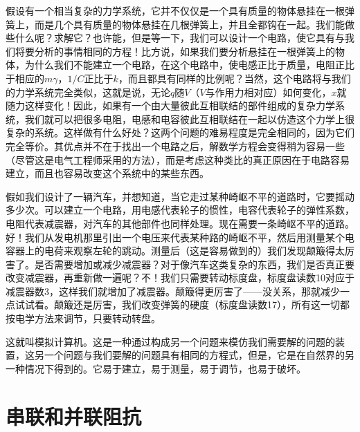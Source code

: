假设有一个相当复杂的力学系统，它并不仅仅是一个具有质量的物体悬挂在一根弹簧上，而是几个具有质量的物体悬挂在几根弹簧上，并且全都钩在一起。我们能做些什么呢？求解它？也许能，但是等一下，我们可以设计一个电路，使它具有与我们将要分析的事情相同的方程！比方说，如果我们要分析悬挂在一根弹簧上的物体，为什么我们不能建立一个电路，在这个电路中，使电感正比于质量，电阻正比于相应的$m\gamma$，$1/C$正比于$k$，而且都具有同样的比例呢？当然，这个电路将与我们的力学系统完全类似，这就是说，无论$q$随$V$（$V$与作用力相对应）如何变化，$x$就随力这样变化！因此，如果有一个由大量彼此互相联结的部件组成的复杂力学系统，我们就可以把很多电阻，电感和电容彼此互相联结在一起以仿造这个力学上很复杂的系统。这样做有什么好处？这两个问题的难易程度是完全相同的，因为它们完全等价。其优点并不在于找出一个电路之后，解数学方程会变得稍为容易一些（尽管这是电气工程师采用的方法），而是考虑这种类比的真正原因在于电路容易建立，而且也容易改变这个系统中的某些东西。

假如我们设计了一辆汽车，并想知道，当它走过某种崎岖不平的道路时，它要摇动多少次。可以建立一个电路，用电感代表轮子的惯性，电容代表轮子的弹性系数，电阻代表减震器，对汽车的其他部件也同样处理。现在需要一条崎岖不平的道路。好！我们从发电机那里引出一个电压来代表某种路的崎岖不平，然后用测量某个电容器上的电荷来观察左轮的跳动。测量后（这是容易做到的）我们发现颠簸得太厉害了。是否需要增加或减少减震器？对于像汽车这类复杂的东西，我们是否真正要改变减震器，再重新做一遍呢？不！我们只需要转动标度盘，标度盘读数10对应于减震器数3，这样我们就增加了减震器。颠簸得更厉害了——没关系，那就减少一点试试看。颠簸还是厉害，我们改变弹簧的硬度（标度盘读数17），所有这一切都按电学方法来调节，只要转动转盘。

这就叫模拟计算机。这是一种通过构成另一个问题来模仿我们需要解的问题的装置，这另一个问题与我们要解的问题具有相同的方程式，但是，它是在自然界的另一种情况下得到的。它易于建立，易于测量，易于调节，也易于破坏。

\section{串联和并联阻抗}

